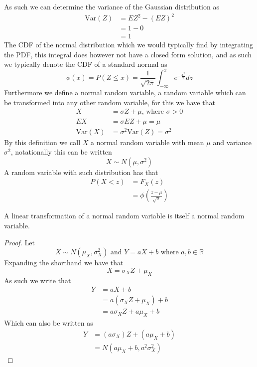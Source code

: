 As such we can determine the variance of the Gaussian distribution as
\begin{align*}
    \text{Var}(Z)&=EZ^{2}-(EZ)^{2} \\
                 &=1-0 \\
                 &=1
\end{align*}
The CDF of the normal distribution which we would typically find by integrating the PDF, this integral does however not have a closed form solution, and as such we typically denote the CDF of a standard normal as
\[
    \phi(x)=P(Z\leq x)=\frac{1}{\sqrt{2\pi}}\int_{-\infty}^{x}e^{-\frac{x^{2}}{2}}dz
\]
Furthermore we define a normal random variable, a random variable which can be transformed into any other random variable, for this we have that
\begin{align*}
    X&=\sigma Z+\mu\text{, where }\sigma>0 \\
    EX&=\sigma EZ+\mu=\mu \\
    \text{Var}(X)&=\sigma^{2}\text{Var}(Z)=\sigma^{2}
\end{align*}
By this definition we call $X$ a normal random variable with mean $\mu$ and variance $\sigma^{2}$, notationally this can be written
\[
    X\sim N(\mu,\sigma^{2})
\]
A random variable with such distribution has that
\begin{align*}
    P(X<z)&=F_{X}(z) \\
          &=\phi\left(\frac{z-\mu}{\sqrt{\sigma}}\right)
\end{align*}
\begin{theorem}
  A linear transformation of a normal random variable is itself a normal random variable.
\end{theorem}
\begin{proof}
  Let
  \[
      X\sim N(\mu_{X},\sigma^{2}_{X})\text{ and }Y=aX+b\text{ where }a,b\in \mathbb{R}
  \]
  Expanding the shorthand we have that
  \[
      X=\sigma_{X}Z+\mu_{X}
  \]
  As such we write that
  \begin{align*}
      Y&=aX+b \\
       &=a(\sigma_{X}Z+\mu_{X})+b \\
       &=a\sigma_{X}Z+a\mu_{X}+b
  \end{align*}
  Which can also be written as
  \begin{align*}
      Y&=(a\sigma_{X})Z+(a\mu_{X}+b) \\
       &=N(a\mu_{X}+b,a^{2}\sigma_{X}^{2})
  \end{align*}
\end{proof}
